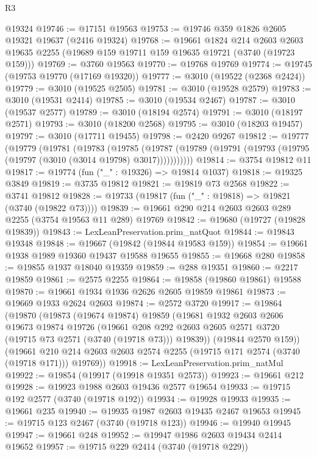 \begin{lexlean}{R3}
\begin{coremodule}
    @19324
@19746 := @17151 @19563
@19753 := @19746 @359 @1826 @2605 @19321 @19637 (@2416 @19324)
@19768 := @19661
    @1824
    @214
    @2603
    @2603
    @19635
    @2255
    (@19689 @159 @19711 @159 @19635 @19721 (@3740 (@19723 @159)))
@19769 := @3760 @19563
@19770 := @19768 @19769
@19774 := @19745 (@19753 @19770 (@17169 @19320))
@19777 := @3010 (@19522 (@2368 @2424))
@19779 := @3010 (@19525 @2505)
@19781 := @3010 (@19528 @2579)
@19783 := @3010 (@19531 @2414)
@19785 := @3010 (@19534 @2467)
@19787 := @3010 (@19537 @2577)
@19789 := @3010 (@18194 @2574)
@19791 := @3010 (@18197 @2571)
@19793 := @3010 (@18200 @2568)
@19795 := @3010 (@18203 @19457)
@19797 := @3010 (@17711 @19455)
@19798 := @2420 @9267
@19812 := @19777
    (@19779
      (@19781
        (@19783
          (@19785
            (@19787 (@19789 (@19791 (@19793 (@19795 (@19797 (@3010 (@3014 @19798) @3017)))))))))))
@19814 := @3754 @19812 @11
@19817 := @19774 (fun ("_" : @19326) => @19814 @1037)
@19818 := @19325 @3849
@19819 := @3735 @19812
@19821 := @19819 @73 @2568
@19822 := @3741 @19812
@19828 := @19733 (@19817 (fun ("_" : @19818) => @19821 (@3740 (@19822 @73))))
@19839 := @19661 @290 @214 @2603 @2603 @289 @2255 (@3754 @19563 @11 @289) @19769
@19842 := @19680 (@19727 (@19828 @19839))
@19843 := LexLeanPreservation.prim_natQuot
@19844 := @19843 @19348
@19848 := @19667 (@19842 (@19844 @19583 @159))
@19854 := @19661 @1938 @1989 @19360 @19437 @19588 @19655
@19855 := @19668 @280
@19858 := @19855 @1937 @18040 @19359
@19859 := @288 @19351
@19860 := @2217 @19859
@19861 := @2575 @2255
@19864 := @19858 (@19860 @19861) @19588
@19870 := @19661 @1934 @1936 @2626 @2605 @19859 @19861
@19873 := @19669 @1933 @2624 @2603
@19874 := @2572 @3720
@19917 := @19864
    (@19870
      (@19873
        (@19674 @19874)
        @19859
        (@19681
          @1932
          @2603
          @2606
          @19673
          @19874
          @19726
          (@19661 @208 @292 @2603 @2605 @2571 @3720 (@19715 @73 @2571 (@3740 (@19718 @73))) @19839))
        (@19844 @2570 @159))
      (@19661 @210 @214 @2603 @2603 @2574 @2255 (@19715 @171 @2574 (@3740 (@19718 @171))) @19769))
@19918 := LexLeanPreservation.prim_natMul
@19922 := @19854 (@19917 (@19918 @19351 @2573))
@19923 := @19661 @212
@19928 := @19923 @1988 @2603 @19436 @2577 @19654
@19933 := @19715 @192 @2577 (@3740 (@19718 @192))
@19934 := @19928 @19933
@19935 := @19661 @235
@19940 := @19935 @1987 @2603 @19435 @2467 @19653
@19945 := @19715 @123 @2467 (@3740 (@19718 @123))
@19946 := @19940 @19945
@19947 := @19661 @248
@19952 := @19947 @1986 @2603 @19434 @2414 @19652
@19957 := @19715 @229 @2414 (@3740 (@19718 @229))

\end{coremodule}
\end{lexlean}

